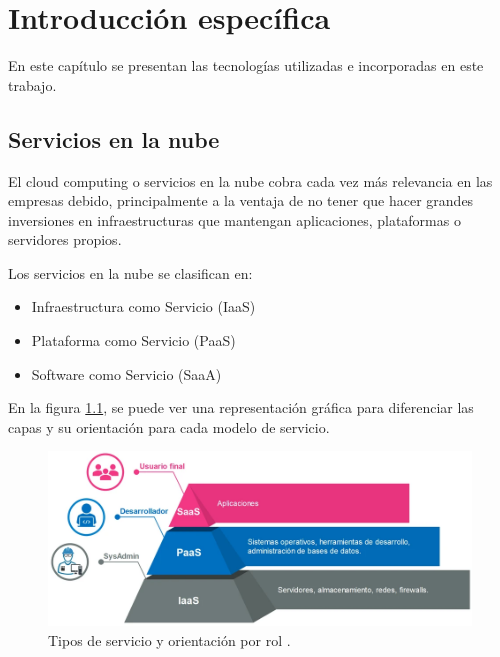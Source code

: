 \chapter{Introducción específica} %

\label{Chapter2}

En este capítulo se presentan las tecnologías utilizadas e incorporadas en este trabajo. 


\section{Servicios en la nube}
El cloud computing o servicios en la nube cobra cada vez más relevancia en las empresas debido, principalmente a la ventaja de no tener que hacer grandes inversiones en infraestructuras que mantengan aplicaciones, plataformas o servidores propios.

Los servicios en la nube se clasifican en:

\begin{itemize}
\item Infraestructura como Servicio (IaaS)
\item Plataforma como Servicio (PaaS)
\item Software como Servicio (SaaA)
\end{itemize}

En la figura \ref{fig:servicios}, se puede ver una representación gráfica para diferenciar las capas y su orientación para cada modelo de servicio.


\begin{figure}[htbp]
	\centering
	\includegraphics[width=.9\textwidth]{./Figures/servicios.png}
	\caption{Tipos de servicio y orientación por rol \protect\footnotemark.}

	\label{fig:servicios}
\end{figure}

